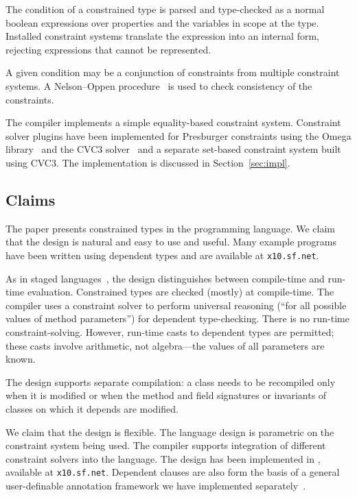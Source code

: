 The condition of a constrained type is parsed and type-checked
as a normal boolean expressions over properties and
the  variables in scope at the type.  Installed
constraint systems translate the expression into an internal
form, rejecting expressions that cannot be represented.

A given condition may be a conjunction of constraints from
multiple constraint systems.
A Nelson--Oppen procedure~\cite{nelson-oppen} is used to check
consistency of the constraints.

The \Xten{} compiler
implements a simple
equality-based constraint system.  Constraint solver plugins
have been implemented for Presburger constraints using the Omega
library~\cite{omega} and the CVC3 solver~\cite{cvc} and a
separate set-based constraint system built using CVC3.
The implementation is
discussed in Section~\ref{sec:impl}.

\subsection{Claims}

The paper presents constrained types in the \Xten{} programming
language.
We claim that the design is natural and easy to use and useful. Many
example programs have been written using dependent types and are
available at {\tt x10.sf.net}.

As in staged languages~\cite{nielson-multistage,ts97-multistage}, the
design distinguishes between compile-time and run-time
evaluation. Constrained types are checked (mostly) at compile-time.
The compiler uses a constraint solver to perform universal reasoning
(``for all possible values of method parameters'') for dependent
type-checking.  There is no run-time constraint-solving.  However,
run-time casts to dependent types are permitted; these casts involve
arithmetic, not algebra---the values of all parameters are known.

The design supports separate compilation: a class needs to be
recompiled only when it is modified or when the method
and field signatures or invariants of classes on which it
depends are modified.

We claim that the design is flexible. The language design is
parametric on the constraint system being used.
The compiler supports
integration of
different constraint solvers into the language.
The design has been implemented
in \Xten{}, available at {\tt x10.sf.net}.
Dependent clauses are also form
the basis of a general user-definable annotation framework we have
implemented separately~\cite{ns07-x10anno}. 

